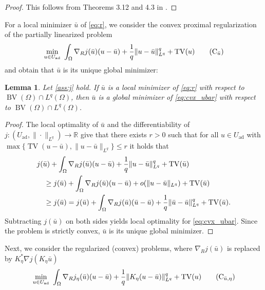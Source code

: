 \documentclass[11pt]{article}
\newcommand{\R}{\mathbb{R}}
\DeclareMathOperator*{\BV}{BV}
\DeclareMathOperator*{\TV}{TV}
\newcommand{\feas}{U_{\textrm{ad}}}
\newtheorem{lemma}[theorem]{Lemma}
\theoremstyle{definition}
\theoremstyle{remark}
\begin{document}
\begin{proof}
This follows from Theorems 3.12 and 4.3 in \cite{natemeyer2022penalty}.
\end{proof}
%
For a local minimizer $\bar{u}$ of \eqref{eq:r}, we consider the convex
proximal regularization of the partially linearized problem
%
\begin{gather}\label{eq:cvx_ubar}
\min_{u \in \feas}\ \int_\Omega \nabla_R j(\bar{u}) (u - \bar{u}) + \frac{1}{q}\|u - \bar{u}\|_{L^{q}}^{q}
+ \TV(u)
\tag{C$_{\bar{u}}$}
\end{gather}
%
and obtain that $\bar{u}$ is its unique global minimizer:
%
\begin{lemma}\label{lem:local_minimizers_minimize_cvx_ubar}
Let \cref{ass:j} hold.
If $\bar{u}$ is a local minimizer of \eqref{eq:r} with respect to $\BV(\Omega) \cap L^q(\Omega)$, then $\bar{u}$ is a
global minimizer of \eqref{eq:cvx_ubar} with respect to $\BV(\Omega) \cap L^q(\Omega)$.
\end{lemma}
\begin{proof}
The local optimality of $\bar{u}$ and the differentiability of
$j : (\feas,\|\cdot\|_{L^q}) \to \R$ give that there exists
$r > 0$ such that for all $u \in \feas$ with $\max\{\TV(u - \bar{u}),\|u - \bar{u}\|_{L^{q}}\} \le r$ it holds that
%
\begin{align*}
\hspace{1em}&\hspace{-1em}
j(\bar{u}) + \int_\Omega \nabla_R j(\bar{u}) (u - \bar{u}) 
+ \frac{1}{q}\|u - \bar{u}\|_{L^{q}}^{q} + \TV(\bar{u})\\
&\ge j(\bar{u}) + \int_\Omega \nabla_R j(\bar{u}) (u - \bar{u}) 
+ o(\|u - \bar{u}\|_{L^{q}}) + \TV(\bar{u})\\
&\ge j(\bar{u}) 
= j(\bar{u}) + \int_\Omega \nabla_R j(\bar{u}) (\bar{u} - \bar{u}) 
+ \frac{1}{q}\|\bar{u} - \bar{u}\|_{L^{q}}^{q} + \TV(\bar{u}).
\end{align*}
%
Subtracting $j(\bar{u})$ on both sides yields local optimality for \eqref{eq:cvx_ubar}. 
Since the problem is strictly convex, $\bar{u}$ is its unique global minimizer.
\end{proof}
%
Next, we consider the regularized (convex) problems, where $\nabla_R  j(\bar{u})$
is replaced by $K_\eta^*\nabla j(K_\eta \bar{u})$
%
\begin{gather}\label{eq:cvx_ubar_eta}
\min_{u \in \feas}\ \int_\Omega \nabla_R j_\eta(\bar{u}) (u - \bar{u}) 
+ \frac{1}{q}\|K_\eta(u - \bar{u})\|_{L^{q}}^{q}
+ \TV(u)
\tag{C$_{\bar{u},\eta}$}
\end{gather}
\end{document}
